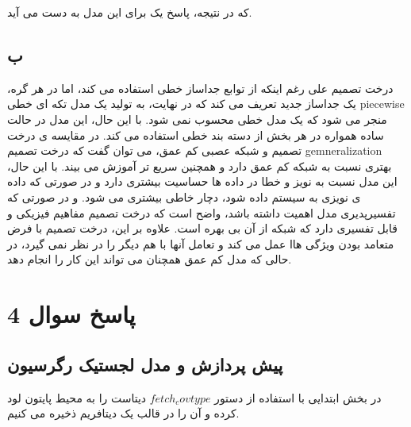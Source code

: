 \documentclass{article}
\begin{document}
که در نتیجه، پاسخ یک برای این مدل به دست می آید.
\subsection{ب}
درخت تصمیم علی رغم اینکه از توابع جداساز خطی استفاده می کند، اما در هر گره، یک جداساز جدید تعریف می کند که در نهایت، به تولید یک مدل تکه ای خطی piecewise منجر می شود که یک مدل خطی محسوب نمی شود. با این حال، این مدل در حالت ساده همواره در هر بخش از دسته بند خطی استفاده می کند. 
در مقایسه ی درخت تصمیم و شبکه عصبی کم عمق، می توان گفت که درخت تصمیم gemneralization بهتری نسبت به شبکه کم عمق دارد و همچنین سریع تر آموزش می بیند. با این حال، این مدل نسبت به نویز و خطا در داده ها حساسیت بیشتری دارد و در صورتی که داده ی نویزی به سیستم داده شود، دچار خاطی بیشتری می شود.  و در صورتی که تفسیرپدیری مدل اهمیت داشته باشد، واضح است که درخت تصمیم مفاهیم فیزیکی و قابل تفسیری دارد که شبکه از آن بی بهره است.
علاوه بر این، درخت تصمیم با فرض متعامد بودن ویژگی هاا عمل می کند و تعامل آنها با هم دیگر را در نظر نمی گیرد، در حالی که مدل کم عمق همچنان می تواند این کار را انجام دهد.

\section{پاسخ سوال 4}
\subsection{پیش پردازش و مدل لجستیک رگرسیون}
در بخش ابتدایی با استفاده از دستور $fetch_covtype$ دیتاست را به محیط پایتون لود کرده و آن را در قالب یک دیتافریم ذخیره می کنیم.
\end{document}
